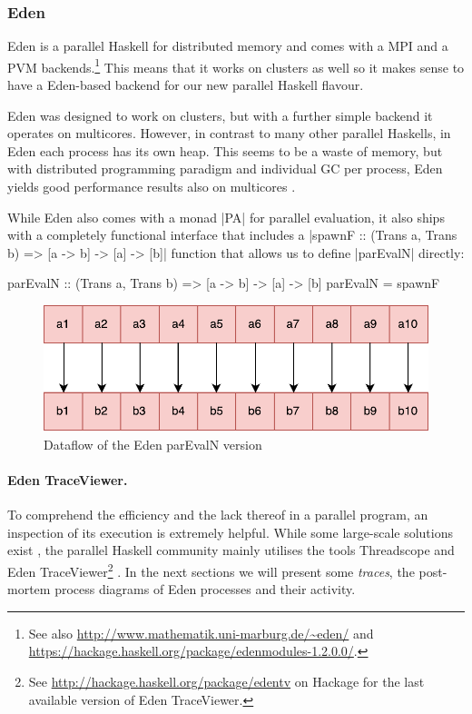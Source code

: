 \subsubsection{Eden}
Eden \cite{eden,Loogen2012} is a parallel Haskell for distributed memory and comes with a MPI and a PVM backends.\footnote{See also \url{http://www.mathematik.uni-marburg.de/~eden/} and \url{https://hackage.haskell.org/package/edenmodules-1.2.0.0/}.} This means that it works on clusters as well so it makes sense to have a Eden-based backend for our new parallel Haskell flavour.

Eden was designed to work on clusters, but with a further simple backend it operates on multicores. However, in contrast to many other parallel Haskells, in Eden each process has its own heap. This seems to be a waste of memory, but with distributed programming paradigm and individual GC per process, Eden yields good performance results also on multicores \cite{arcs-dc,aswad2009low}.

While Eden also comes with a monad |PA| for parallel evaluation, it also ships with a completely functional interface that includes
a |spawnF :: (Trans a, Trans b) => [a -> b] -> [a] -> [b]|
function that
allows us to define |parEvalN| directly:

\begin{code}
parEvalN :: (Trans a, Trans b) => [a -> b] -> [a] -> [b]
parEvalN = spawnF 
\end{code}
\begin{figure}[h]
	\includegraphics[scale=0.5]{images/parEvalNEden}
	\caption{Dataflow of the Eden parEvalN version}
\end{figure}

\paragraph{Eden TraceViewer.}
To comprehend the efficiency and the lack thereof in a parallel program, an inspection of its execution is extremely helpful. While some large-scale solutions exist \cite{Geimer2010}, the parallel Haskell community mainly utilises the tools Threadscope \cite{Wheeler2009} and Eden TraceViewer\footnote{See \url{http://hackage.haskell.org/package/edentv} on Hackage for the last available version of Eden TraceViewer.} \cite{Berthold2007a}. In the next sections we will present some \emph{traces}, the post-mortem process diagrams of Eden processes and their activity.

